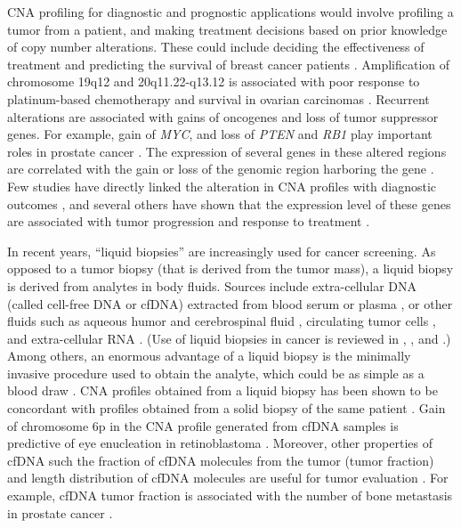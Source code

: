 CNA profiling for diagnostic and prognostic applications would involve
profiling a tumor from a patient, and making treatment decisions based
on prior knowledge of copy number alterations.
%
These could include deciding the effectiveness of treatment and
predicting the survival of breast cancer patients
\citep{stuart2009linking,hicks2006novel}.
Amplification of chromosome 19q12 and 20q11.22-q13.12 is associated with
poor response to platinum-based chemotherapy and survival in ovarian
carcinomas \citep{etemadmoghadam2009integrated}.
%
Recurrent alterations are associated with gains of oncogenes and loss of
tumor suppressor genes. For example, gain of \emph{MYC}, and loss of
\emph{PTEN} and \emph{RB1} play important roles in prostate cancer
\citep{alexander2018utility}.
%
The expression of several genes in these altered regions are correlated
with the gain or loss of the genomic region harboring the gene
\citep{pollack2002microarray,chitale2009integrated,lu2011integrated}.
%
Few studies have directly linked the alteration in CNA profiles with
diagnostic outcomes \citep{etemadmoghadam2009integrated,
bardelli2013amplification,berry2018genomic}, and several others have
shown that the expression level of these genes are associated with tumor
progression and response to treatment \citep{shattuck2008met,
gorre2001clinical,villanueva2013concurrent}.

In recent years, ``liquid biopsies'' are increasingly used for
cancer screening. As opposed to a tumor biopsy (that is derived from the
tumor mass), a liquid biopsy is derived from analytes in body fluids.
Sources include extra-cellular DNA (called cell-free DNA or cfDNA)
extracted from blood serum or plasma
\citep{leary2012detection,chan2013cancer,li2017cell}, or other fluids
such as aqueous humor \citep{berry2017potential} and cerebrospinal fluid
\citep{mouliere2018detection}, circulating tumor cells
\citep{dago2014rapid}, and extra-cellular RNA
\citep{zaporozhchenko2018potential}.  (Use of liquid biopsies in cancer
is reviewed in \cite{heitzer2019current}, \cite{crowley2013liquid},
and \cite{schwarzenbach2011cell}.)
%
Among others, an enormous advantage of a liquid biopsy is the minimally
invasive procedure used to obtain the analyte, which could be as simple
as a blood draw \citep{heitzer2019current}.
%
CNA profiles obtained from a liquid biopsy has been shown to be
concordant with profiles obtained from a solid biopsy of the same
patient \citep{chan2013cancer,berry2017potential}.
%
Gain of chromosome 6p in the CNA profile generated from cfDNA samples is
predictive of eye enucleation in retinoblastoma
\citep{berry2018genomic}.
%
Moreover, other properties of cfDNA such the fraction of cfDNA molecules
from the tumor (tumor fraction) and length distribution of cfDNA
molecules are useful for tumor evaluation \citep{choudhury2018tumor,
mouliere2018enhanced,underhill2016fragment,cristiano2019genome}.  For
example, cfDNA tumor fraction is associated with the number of bone
metastasis in prostate cancer \citep{choudhury2018tumor}.


